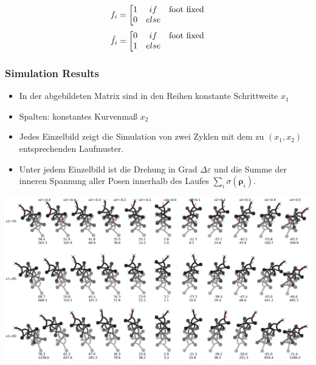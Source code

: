 \documentclass[10pt,a4paper]{article}
\begin{document}
\begin{itemize}
\begin{equation}
f_i = \left[
\begin{matrix}
1 & if & \textnormal{foot fixed} \\ 
0 & else& \\
\end{matrix} \right.
\end{equation}
\begin{equation}
\bar{f}_i = \left[
\begin{matrix}
0 & if& \textnormal{foot fixed} \\ 
1 & else& \\
\end{matrix} \right.
\end{equation}
\end{itemize}

\subsubsection{Simulation Results}

\begin{itemize}
	\item In der abgebildeten Matrix sind in den Reihen konstante Schrittweite $x_1$ 
	\item Spalten: konstantes Kurvenmaß $x_2$
	\item Jedes Einzelbild zeigt die Simulation von zwei Zyklen mit dem zu $(x_1, x_2)$ entsprechenden Laufmuster.
	\item Unter jedem Einzelbild ist die Drehung in Grad $\Delta \varepsilon$ und die Summe der inneren Spannung aller Posen innerhalb des Laufes $\sum_i \sigma(\bm{\rho}_i)$.
	
\end{itemize}


\includegraphics[width=.95\textwidth]{pics/model_2/gait.jpg}
\end{document}
